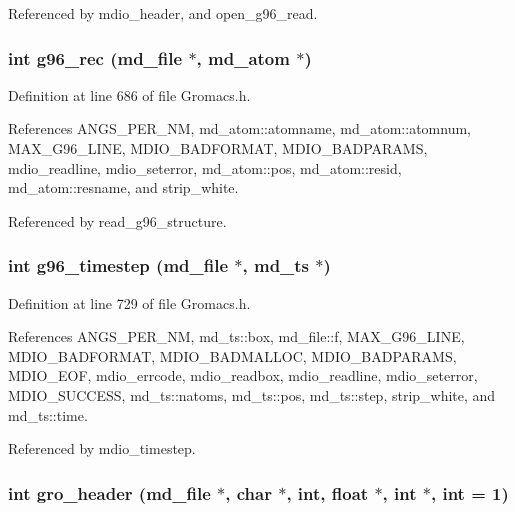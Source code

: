 Referenced by mdio\_\-header, and open\_\-g96\_\-read.
\subsubsection{\setlength{\rightskip}{0pt plus 5cm}int g96\_\-rec ({\bf md\_\-file} $\ast$, {\bf md\_\-atom} $\ast$)\hspace{0.3cm}{\tt  [static]}}\label{Gromacs_8h_a51}




Definition at line 686 of file Gromacs.h.

References ANGS\_\-PER\_\-NM, md\_\-atom::atomname, md\_\-atom::atomnum, MAX\_\-G96\_\-LINE, MDIO\_\-BADFORMAT, MDIO\_\-BADPARAMS, mdio\_\-readline, mdio\_\-seterror, md\_\-atom::pos, md\_\-atom::resid, md\_\-atom::resname, and strip\_\-white.

Referenced by read\_\-g96\_\-structure.
\subsubsection{\setlength{\rightskip}{0pt plus 5cm}int g96\_\-timestep ({\bf md\_\-file} $\ast$, {\bf md\_\-ts} $\ast$)\hspace{0.3cm}{\tt  [static]}}\label{Gromacs_8h_a50}




Definition at line 729 of file Gromacs.h.

References ANGS\_\-PER\_\-NM, md\_\-ts::box, md\_\-file::f, MAX\_\-G96\_\-LINE, MDIO\_\-BADFORMAT, MDIO\_\-BADMALLOC, MDIO\_\-BADPARAMS, MDIO\_\-EOF, mdio\_\-errcode, mdio\_\-readbox, mdio\_\-readline, mdio\_\-seterror, MDIO\_\-SUCCESS, md\_\-ts::natoms, md\_\-ts::pos, md\_\-ts::step, strip\_\-white, and md\_\-ts::time.

Referenced by mdio\_\-timestep.
\subsubsection{\setlength{\rightskip}{0pt plus 5cm}int gro\_\-header ({\bf md\_\-file} $\ast$, char $\ast$, int, float $\ast$, int $\ast$, int = 1)\hspace{0.3cm}{\tt  [static]}}\label{Gromacs_8h_a40}




